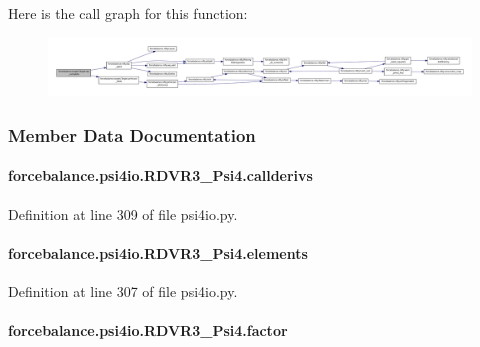 Here is the call graph for this function\-:\nopagebreak
\begin{figure}[H]
\begin{center}
\leavevmode
\includegraphics[width=350pt]{classforcebalance_1_1target_1_1Target_af6099ec09486213869dba2491bd8ea04_cgraph}
\end{center}
\end{figure}




\subsubsection{Member Data Documentation}
\hypertarget{classforcebalance_1_1psi4io_1_1RDVR3__Psi4_aac0fda10840086df3d343c722addbb3c}{
\paragraph[{callderivs}]{\setlength{\rightskip}{0pt plus 5cm}forcebalance.\-psi4io.\-R\-D\-V\-R3\-\_\-\-Psi4.\-callderivs}}\label{classforcebalance_1_1psi4io_1_1RDVR3__Psi4_aac0fda10840086df3d343c722addbb3c}


Definition at line 309 of file psi4io.\-py.

\hypertarget{classforcebalance_1_1psi4io_1_1RDVR3__Psi4_af55d3d535249fb29e26f7fd236f6b08e}{
\paragraph[{elements}]{\setlength{\rightskip}{0pt plus 5cm}forcebalance.\-psi4io.\-R\-D\-V\-R3\-\_\-\-Psi4.\-elements}}\label{classforcebalance_1_1psi4io_1_1RDVR3__Psi4_af55d3d535249fb29e26f7fd236f6b08e}


Definition at line 307 of file psi4io.\-py.

\hypertarget{classforcebalance_1_1psi4io_1_1RDVR3__Psi4_a032ae110d73b70f0a1fbb36b2332dfb2}{
\paragraph[{factor}]{\setlength{\rightskip}{0pt plus 5cm}forcebalance.\-psi4io.\-R\-D\-V\-R3\-\_\-\-Psi4.\-factor}}\label{classforcebalance_1_1psi4io_1_1RDVR3__Psi4_a032ae110d73b70f0a1fbb36b2332dfb2}


